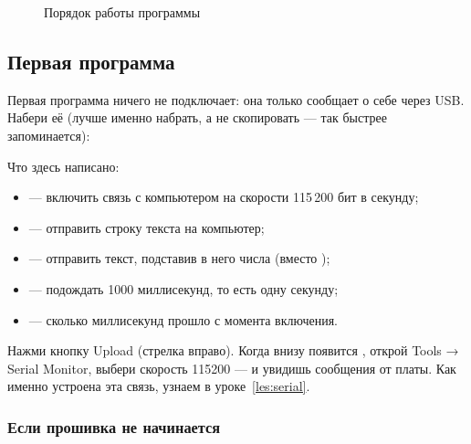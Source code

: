 \begin{figure}[H]
\centering
{}
\caption{Порядок работы программы}
\end{figure}

\subsection{Первая программа}

Первая программа ничего не подключает: она только сообщает о себе через USB. Набери её (лучше
именно набрать, а не скопировать --- так быстрее запоминается):


Что здесь написано:
\begin{itemize}
  \item {} --- включить связь с компьютером на скорости 115\,200 бит в секунду;
  \item {} --- отправить строку текста на компьютер;
  \item {} --- отправить текст, подставив в него числа (вместо );
  \item {} --- подождать 1000 миллисекунд, то есть одну секунду;
  \item {} --- сколько миллисекунд прошло с момента включения.
\end{itemize}

Нажми кнопку \textsf{Upload} (стрелка вправо). Когда внизу появится , открой
\textsf{Tools → Serial Monitor}, выбери скорость 115200 --- и увидишь сообщения от платы.
Как именно устроена эта связь, узнаем в уроке~\ref{les:serial}.

\subsubsection{Если прошивка не начинается}

